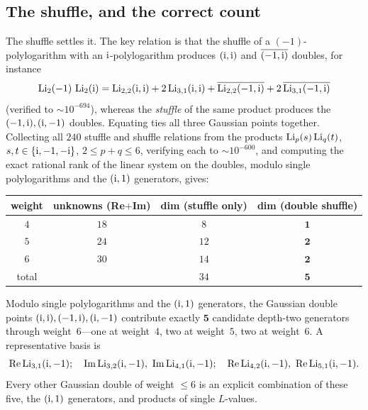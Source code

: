 \subsection{The shuffle, and the correct count}

The shuffle settles it. The key relation is that the shuffle of a $(-1)$-polylogarithm with an
$\mathrm{i}$-polylogarithm produces $(\mathrm{i},\mathrm{i})$ and $\overline{(-1,\mathrm{i})}$ doubles, for instance
\begin{equation}\label{double:eq:shuffle-22}
  \operatorname{Li}_2(-1)\,\operatorname{Li}_2(\mathrm{i})=\operatorname{Li}_{2,2}(\mathrm{i},\mathrm{i})+2\operatorname{Li}_{3,1}(\mathrm{i},\mathrm{i})
     +\overline{\operatorname{Li}_{2,2}(-1,\mathrm{i})}+2\,\overline{\operatorname{Li}_{3,1}(-1,\mathrm{i})}
\end{equation}
(verified to ${\sim}10^{-694}$), whereas the \emph{stuffle} of the same product produces the
$(-1,\mathrm{i}),(\mathrm{i},-1)$ doubles. Equating ties all three Gaussian points together. Collecting all $240$
stuffle and shuffle relations from the products $\operatorname{Li}_p(s)\operatorname{Li}_q(t)$, $s,t\in\{\mathrm{i},-1,-\mathrm{i}\}$,
$2\le p+q\le6$, verifying each to ${\sim}10^{-600}$, and computing the exact rational rank of the
linear system on the doubles, modulo single polylogarithms and the $(\mathrm{i},1)$ generators, gives:

\begin{center}
\renewcommand{\arraystretch}{1.2}
\begin{tabular}{c c c c}
\hline
weight & unknowns (Re$+$Im) & dim (stuffle only) & dim (double shuffle)\\
\hline
$4$ & $18$ & $8$  & $\mathbf 1$\\
$5$ & $24$ & $12$ & $\mathbf 2$\\
$6$ & $30$ & $14$ & $\mathbf 2$\\
\hline
total & & $34$ & $\mathbf 5$\\
\hline
\end{tabular}
\end{center}

\begin{observation}\label{double:thm:gauss-5}
Modulo single polylogarithms and the $(\mathrm{i},1)$ generators, the Gaussian double points
$(\mathrm{i},\mathrm{i}),(-1,\mathrm{i}),(\mathrm{i},-1)$ contribute exactly $\mathbf 5$ candidate depth-two generators through
weight~$6$---one at weight~$4$, two at weight~$5$, two at weight~$6$. A representative basis is
\[
  \operatorname{Re}\operatorname{Li}_{3,1}(\mathrm{i},-1);\quad \operatorname{Im}\operatorname{Li}_{3,2}(\mathrm{i},-1),\ \operatorname{Im}\operatorname{Li}_{4,1}(\mathrm{i},-1);\quad
  \operatorname{Re}\operatorname{Li}_{4,2}(\mathrm{i},-1),\ \operatorname{Re}\operatorname{Li}_{5,1}(\mathrm{i},-1).
\]
Every other Gaussian double of weight $\le6$ is an explicit combination of these five, the $(\mathrm{i},1)$
generators, and products of single $L$-values.
\end{observation}

